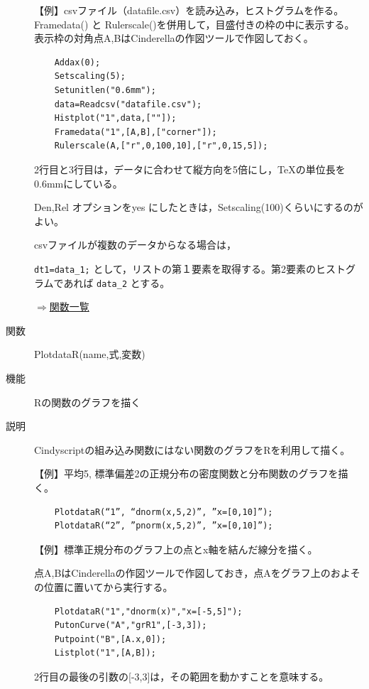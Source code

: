 \documentclass[papersize,a4paper,12pt,uplatex]{jsarticle}
\begin{document}
\begin{description}
\vspace{\baselineskip}
【例】csvファイル（datafile.csv）を読み込み，ヒストグラムを作る。Framedata() と Rulerscale()を併用して，目盛付きの枠の中に表示する。表示枠の対角点A,BはCinderellaの作図ツールで作図しておく。
\begin{verbatim}
    Addax(0);
    Setscaling(5);
    Setunitlen("0.6mm");
    data=Readcsv("datafile.csv");
    Histplot("1",data,[""]);
    Framedata("1",[A,B],["corner"]);
    Rulerscale(A,["r",0,100,10],["r",0,15,5]);
\end{verbatim}
    \begin{center}  \end{center}

2行目と3行目は，データに合わせて縦方向を5倍にし，TeXの単位長を0.6mmにしている。

Den,Rel オプションをyes にしたときは，Setscaling(100)くらいにするのがよい。

csvファイルが複数のデータからなる場合は，

    \verb|dt1=data_1;|
として，リストの第１要素を取得する。第2要素のヒストグラムであれば  \verb|data_2| とする。

\vspace{\baselineskip}
\begin{flushright}  \hyperlink{functionlist}{$\Rightarrow$関数一覧}\end{flushright}

\hypertarget{plotdatar}{}
\item[関数]  PlotdataR(name,式,変数)
\item[機能]  Rの関数のグラフを描く
\item[説明]  Cindyscriptの組み込み関数にはない関数のグラフをRを利用して描く。

\vspace{\baselineskip}
【例】平均5, 標準偏差2の正規分布の密度関数と分布関数のグラフを描く。
\begin{verbatim}
    PlotdataR(“1”, “dnorm(x,5,2)”, ”x=[0,10]”);
    PlotdataR(“2”, ”pnorm(x,5,2)”, ”x=[0,10]”);
\end{verbatim}

\hspace{20mm} 

【例】標準正規分布のグラフ上の点とx軸を結んだ線分を描く。

点A,BはCinderellaの作図ツールで作図しておき，点Aをグラフ上のおよその位置に置いてから実行する。
\begin{verbatim}
    PlotdataR("1","dnorm(x)","x=[-5,5]");
    PutonCurve("A","grR1",[-3,3]);
    Putpoint("B",[A.x,0]);
    Listplot("1",[A,B]);
\end{verbatim}
2行目の最後の引数の[-3,3]は，その範囲を動かすことを意味する。


\end{description}
\end{document}
